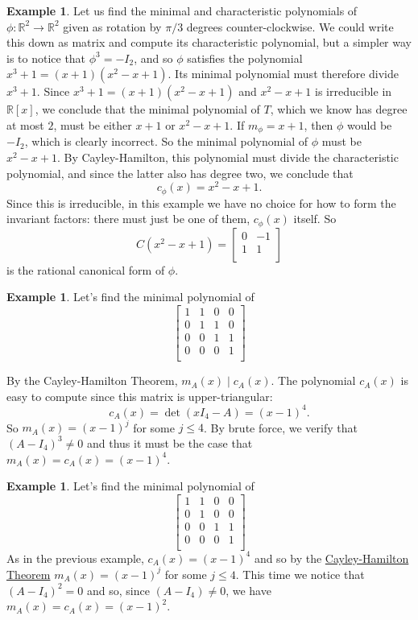 \documentclass[12pt]{report}
\numberwithin{equation}{section}
\numberwithin{theorem}{chapter}
\theoremstyle{definition}
\newtheorem{example}[theorem]{Example}
\newtheorem*{basic properties}{Basic Properties}
\newtheorem*{Important Remark}{Important Remark}
\begin{document}
\begin{example}\label{example rotation 60}
Let us find the minimal and characteristic polynomials of $\phi: \mathbb{R}^2 \to \mathbb{R}^2$ given as rotation by $\pi/3$ degrees counter-clockwise. We could write this down as matrix and compute its characteristic polynomial, but a simpler way is to notice that $\phi^3 = -I_2$, and so $\phi$ satisfies the polynomial $x^3 + 1 = (x+1)(x^2 - x + 1)$. Its minimal polynomial must therefore divide $x^3 +1$. Since $x^3 +1 = (x+1)(x^2 - x +1)$ and $x^2 - x +1$ is irreducible in $\mathbb{R}[x]$, we conclude that the minimal polynomial of $T$, which we know has degree at most $2$, must be either $x+1$ or $x^2 - x +1$. If $m_\phi = x+1$, then $\phi$ would be $-I_2$, which is clearly incorrect. So the minimal polynomial of $\phi$ must be $x^2 - x +1$. By Cayley-Hamilton, this polynomial must divide the characteristic polynomial, and since the latter also has degree two, we conclude that
$$c_\phi(x) = x^2 - x + 1.$$
Since this is irreducible, in this example we have no choice for how to form the invariant factors: there must just be one of them, $c_\phi(x)$ itself. So
$$C(x^2 - x + 1) = 
\begin{bmatrix}
0 & -1 \\
1 & 1 \\
\end{bmatrix}$$
is the rational canonical form of $\phi$. 
\end{example}



\begin{example} 
Let's find the minimal polynomial of 
$$
\begin{bmatrix}
1 & 1 & 0 & 0 \\
0 & 1 & 1 & 0 \\
0 &  0 & 1 & 1 \\
0 &  0 & 0 & 1 \\
\end{bmatrix}
$$

By the Cayley-Hamilton Theorem, $m_A(x) \mid c_A(x)$. The polynomial $c_A(x)$ is easy to compute since this matrix is upper-triangular:
$$c_A(x) = \det(xI_4 - A) = (x-1)^4.$$ 
So $m_A(x) = (x-1)^j$ for some $j \leqslant 4$. By brute force, we verify that $(A-I_4)^3 \neq 0$ and thus it must be the case that $m_A(x) = c_A(x) = (x-1)^4$. 
\end{example}

\begin{example} 
Let's find the minimal polynomial of 
$$\begin{bmatrix}
1 & 1 & 0 & 0 \\
0 & 1 & 0 & 0 \\
0 &  0 & 1 & 1 \\
0 &  0 & 0 & 1 \\
\end{bmatrix}$$
As in the previous example, $c_A(x) = (x-1)^4$ and so by the \hyperref[cayley-hamilton]{Cayley-Hamilton Theorem}
$m_A(x) = (x-1)^j$ for some $j \leqslant 4$. This time we notice that $(A-I_4)^2 = 0$ and so, since $(A-I_4) \neq 0$, we have $m_A(x) = c_A(x) = (x-1)^2$. 
\end{example}
\end{document}
